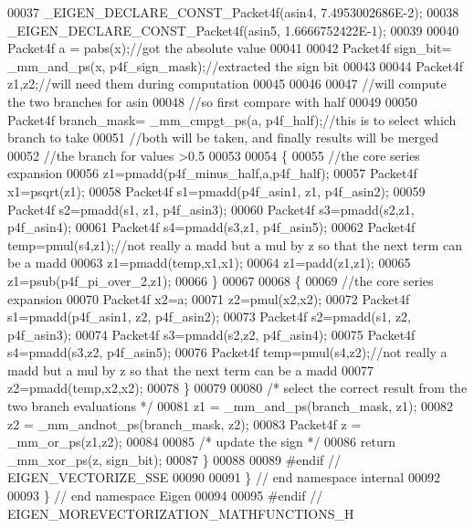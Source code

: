 \begin{DoxyCode}
00037   \_EIGEN\_DECLARE\_CONST\_Packet4f(asin4, 7.4953002686E-2);
00038   \_EIGEN\_DECLARE\_CONST\_Packet4f(asin5, 1.6666752422E-1);
00039 
00040   Packet4f a = pabs(x);\textcolor{comment}{//got the absolute value}
00041 
00042   Packet4f sign\_bit= \_mm\_and\_ps(x, p4f\_sign\_mask);\textcolor{comment}{//extracted the sign bit}
00043 
00044   Packet4f z1,z2;\textcolor{comment}{//will need them during computation    }
00045 
00046 
00047 \textcolor{comment}{//will compute the two branches for asin}
00048 \textcolor{comment}{//so first compare with half}
00049 
00050   Packet4f branch\_mask= \_mm\_cmpgt\_ps(a, p4f\_half);\textcolor{comment}{//this is to select which branch to take}
00051 \textcolor{comment}{//both will be taken, and finally results will be merged}
00052 \textcolor{comment}{//the branch for values >0.5}
00053 
00054     \{
00055 \textcolor{comment}{//the core series expansion }
00056     z1=pmadd(p4f\_minus\_half,a,p4f\_half);
00057     Packet4f x1=psqrt(z1);
00058     Packet4f s1=pmadd(p4f\_asin1, z1, p4f\_asin2);
00059     Packet4f s2=pmadd(s1, z1, p4f\_asin3);
00060     Packet4f s3=pmadd(s2,z1, p4f\_asin4);
00061     Packet4f s4=pmadd(s3,z1, p4f\_asin5);
00062     Packet4f temp=pmul(s4,z1);\textcolor{comment}{//not really a madd but a mul by z so that the next term can be a madd}
00063     z1=pmadd(temp,x1,x1);
00064     z1=padd(z1,z1);
00065     z1=psub(p4f\_pi\_over\_2,z1);
00066     \}
00067 
00068     \{
00069 \textcolor{comment}{//the core series expansion }
00070     Packet4f x2=a;
00071     z2=pmul(x2,x2);
00072     Packet4f s1=pmadd(p4f\_asin1, z2, p4f\_asin2);
00073     Packet4f s2=pmadd(s1, z2, p4f\_asin3);
00074     Packet4f s3=pmadd(s2,z2, p4f\_asin4);
00075     Packet4f s4=pmadd(s3,z2, p4f\_asin5);
00076     Packet4f temp=pmul(s4,z2);\textcolor{comment}{//not really a madd but a mul by z so that the next term can be a madd}
00077     z2=pmadd(temp,x2,x2);
00078     \}
00079 
00080 \textcolor{comment}{/* select the correct result from the two branch evaluations */}
00081   z1  = \_mm\_and\_ps(branch\_mask, z1);
00082   z2  = \_mm\_andnot\_ps(branch\_mask, z2);
00083   Packet4f z  = \_mm\_or\_ps(z1,z2);
00084 
00085 \textcolor{comment}{/* update the sign */}
00086   \textcolor{keywordflow}{return} \_mm\_xor\_ps(z, sign\_bit);
00087 \}
00088 
00089 \textcolor{preprocessor}{#endif // EIGEN\_VECTORIZE\_SSE}
00090 
00091 \} \textcolor{comment}{// end namespace internal}
00092 
00093 \} \textcolor{comment}{// end namespace Eigen}
00094 
00095 \textcolor{preprocessor}{#endif // EIGEN\_MOREVECTORIZATION\_MATHFUNCTIONS\_H}
\end{DoxyCode}
